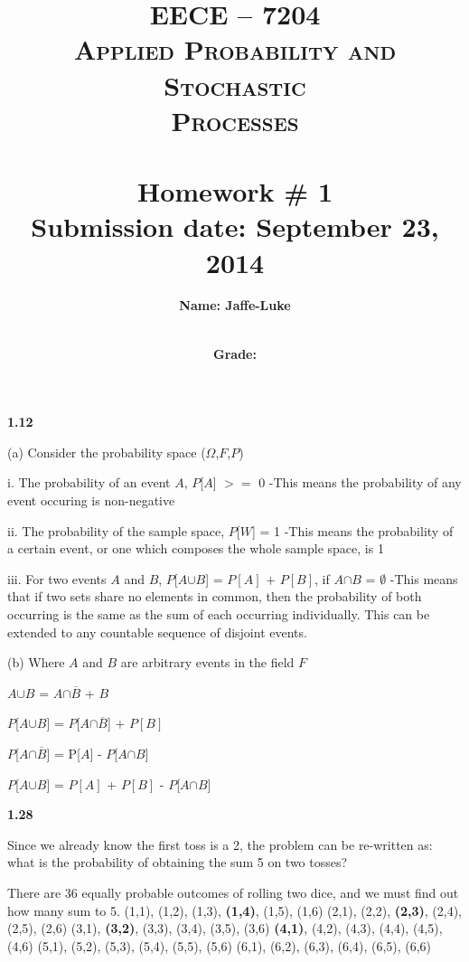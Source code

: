 \documentclass{report}
\title{	\vspace{-2in}
\normalfont \normalsize 
\textsc{\Huge EECE -- 7204 \\Applied Probability and Stochastic \\ [10 pt]Processes} \\ [50pt] 
\horrule{0.5pt} \\[0.4cm] 
\huge Homework \# 1   \\ [15pt]
\normalsize Submission date: September 23, 2014
\horrule{2pt} \\[0.5cm] 
}
\author{ \vspace{3in}\huge \textbf{Name: Jaffe-Luke} \\ 
[55pt] \horrule{2pt} \\[0.5cm] }
\date{\textbf{Grade: }}
\begin{document}
\maketitle
\newpage

\textbf{1.12}
\newline

(a) Consider the probability space ($\Omega$,$F$,$P$)

i. The probability of an event $A$, $P$[$A$] $>=$ 0
\newline -This means the probability of any event occuring is non-negative

ii. The probability of the sample space, $P$[$W$] = 1
\newline -This means the probability of a certain event, or one which composes the whole sample space, is 1

iii. For two events $A$ and $B$, $P$[$A$$\cup$$B$] = $P[A]$ + $P[B]$, if $A$$\cap$$B$ = $\emptyset$
\newline -This means that if two sets share no elements in common, then the probability of both occurring is the same as the sum of each occurring individually. This can be extended to any countable sequence of disjoint events.
\newline

(b) Where $A$ and $B$ are arbitrary events in the field $F$

$A$$\cup$$B$ = $A$$\cap$$\overline{B}$ + $B$

$P$[$A$$\cup$$B$] = $P$[$A$$\cap$$\overline{B}$] + $P[B]$

$P$[$A$$\cap$$\overline{B}$] = P[$A$] - $P$[$A$$\cap$$B$]

$P$[$A$$\cup$$B$] = $P[A]$ + $P[B]$ - $P$[$A$$\cap$$B$]
\newline

\textbf{1.28}

Since we already know the first toss is a 2, the problem can be re-written as: what is the probability of obtaining the sum 5 on two tosses?

There are 36 equally probable outcomes of rolling two dice, and we must find out how many sum to 5.
\newline
(1,1), (1,2), (1,3), \textbf{(1,4)}, (1,5), (1,6) \newline
(2,1), (2,2), \textbf{(2,3)}, (2,4), (2,5), (2,6) \newline
(3,1), \textbf{(3,2)}, (3,3), (3,4), (3,5), (3,6) \newline
\textbf{(4,1)}, (4,2), (4,3), (4,4), (4,5), (4,6) \newline
(5,1), (5,2), (5,3), (5,4), (5,5), (5,6) \newline
(6,1), (6,2), (6,3), (6,4), (6,5), (6,6) \newline
\end{document}

